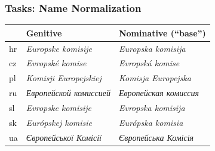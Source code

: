 \documentclass{beamer}
\newcommand\textcyr[1]{{\fontencoding{T2A}\selectfont #1}}
\newcommand{\comment}[1]{}
\begin{document}
\begin{frame}[fragile]
 \frametitle{Tasks: Name Normalization}

\begin{table}
  \begin{center}
    \begin{footnotesize}      
      \begin{tabular}{lll}
        \toprule 
        \comment{Lan} & {Genitive} & {Nominative (``base'')}\\
        \midrule
        hr & {\color{blue}\textit{Europske komisije}} & {\color{blue}\textit{Europska komisija}} \\
        cz & {\color{blue}\textit{Evropsk\'{e} komise}} & {\color{blue}\textit{Evropsk\'{a} komise}} \\
        pl & {\color{blue}\textit{Komisji Europejskiej}} & {\color{blue}\textit{Komisja Europejska}} \\
       ru & {\color{blue}\textit{\textcyr{Европейской комиссией}}} & {\color{blue}\textit{\textcyr{Европейская комиссия}}} \\
        sl & {\color{blue}\textit{Evropske komisije}} & {\color{blue}\textit{Evropska komisija}} \\
        sk & {\color{blue}\textit{Európskej komisie}} & {\color{blue}\textit{Európska komisia}} \\
        ua & {\color{blue}\textit{\textcyr{Європейської Комісії}}} & {\color{blue}\textit{\textcyr{Європейська Комісія}}} \\
        \bottomrule
      \end{tabular}
    \end{footnotesize}
  \end{center}
\end{table}

\end{frame}
\end{document}

